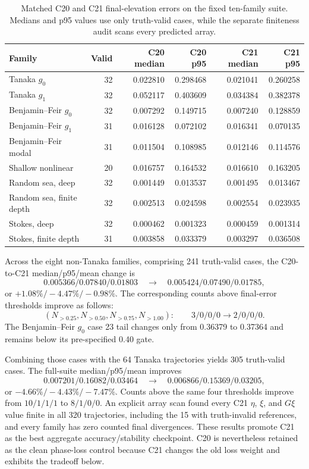 \documentclass[11pt]{article}
\begin{document}
\begin{table}[htbp]
\centering
\small
\begin{tabular}{lrrrrr}
\toprule
Family & Valid & C20 median & C20 p95 & C21 median & C21 p95 \\
\midrule
Tanaka $g_0$       & 32 & 0.022810 & 0.298468 & 0.021041 & 0.260258 \\
Tanaka $g_1$       & 32 & 0.052117 & 0.403609 & 0.034384 & 0.382378 \\
Benjamin--Feir $g_0$ & 32 & 0.007292 & 0.149715 & 0.007240 & 0.128859 \\
Benjamin--Feir $g_1$ & 31 & 0.016128 & 0.072102 & 0.016341 & 0.070135 \\
Benjamin--Feir modal & 31 & 0.011504 & 0.108985 & 0.012146 & 0.114576 \\
Shallow nonlinear & 20 & 0.016757 & 0.164532 & 0.016610 & 0.163205 \\
Random sea, deep & 32 & 0.001449 & 0.013537 & 0.001495 & 0.013467 \\
Random sea, finite depth & 32 & 0.002513 & 0.024598 & 0.002554 & 0.023935 \\
Stokes, deep & 32 & 0.000462 & 0.001323 & 0.000459 & 0.001314 \\
Stokes, finite depth & 31 & 0.003858 & 0.033379 & 0.003297 & 0.036508 \\
\bottomrule
\end{tabular}
\caption{Matched C20 and C21 final-elevation errors on the fixed ten-family
suite.  Medians and p95 values use only truth-valid cases, while the separate
finiteness audit scans every predicted array.}
\label{tab:c20-c21-suite}
\end{table}

Across the eight non-Tanaka families, comprising 241 truth-valid cases, the
C20-to-C21 median/p95/mean change is
\[
  0.005366/0.07840/0.01803
  \quad\longrightarrow\quad
  0.005424/0.07490/0.01785,
\]
or \(+1.08\%/-4.47\%/-0.98\%\).  The corresponding counts above final-error
thresholds improve as follows:
\[
 (N_{>0.25},N_{>0.50},N_{>0.75},N_{>1.00}):
 \qquad 3/0/0/0\longrightarrow2/0/0/0.
\]
The Benjamin--Feir \(g_0\) case 23 tail changes only from
0.36379 to 0.37364 and remains below its pre-specified 0.40 gate.

Combining those cases with the 64 Tanaka trajectories yields 305 truth-valid
cases.  The full-suite median/p95/mean improves
\[
  0.007201/0.16082/0.03464
  \quad\longrightarrow\quad
  0.006866/0.15369/0.03205,
\]
or \(-4.66\%/-4.43\%/-7.47\%\).  Counts above the same four thresholds
improve from \(10/1/1/1\) to \(8/1/0/0\).  An explicit array scan found every
C21 \(\eta\), \(\xi\), and \(G\xi\) value finite in all 320 trajectories,
including the 15 with truth-invalid references, and every family has zero
counted final divergences.  These results promote C21 as the best aggregate
accuracy/stability checkpoint.  C20 is nevertheless retained as the clean
phase-loss control because C21 changes the old loss weight and exhibits the
tradeoff below.
\end{document}
